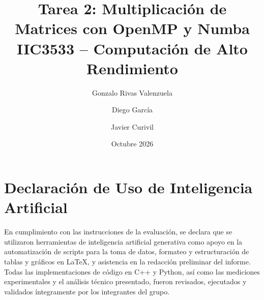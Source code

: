 \documentclass[12pt,letterpaper]{article}
\title{\textbf{Tarea 2: Multiplicación de Matrices con OpenMP y Numba}\\ \large IIC3533 -- Computación de Alto Rendimiento}
\author{Gonzalo Rivas Valenzuela \and Diego García \and Javier Curivil}
\date{Octubre 2026}
\begin{document}
\maketitle









\section*{Declaración de Uso de Inteligencia Artificial}
En cumplimiento con las instrucciones de la evaluación, se declara que se utilizaron herramientas de inteligencia artificial generativa como apoyo en la automatización de scripts para la toma de datos, formateo y estructuración de tablas y gráficos en \LaTeX, y asistencia en la redacción preliminar del informe. Todas las implementaciones de código en C++ y Python, así como las mediciones experimentales y el análisis técnico presentado, fueron revisados, ejecutados y validados íntegramente por los integrantes del grupo.
\end{document}
